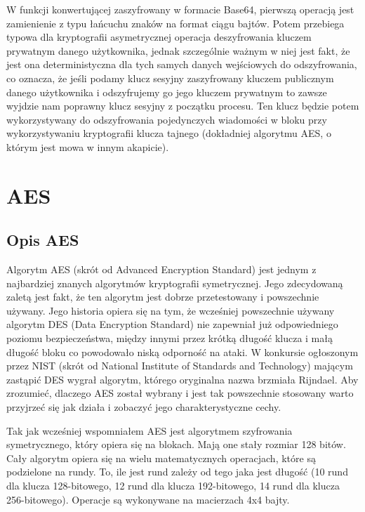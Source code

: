 W funkcji konwertującej zaszyfrowany w formacie Base64, pierwszą operacją jest zamienienie z typu łańcuchu znaków na format ciągu bajtów. Potem przebiega typowa dla kryptografii asymetrycznej operacja deszyfrowania kluczem prywatnym danego użytkownika, jednak szczególnie ważnym w niej jest fakt, że jest ona deterministyczna dla tych samych danych wejściowych do odszyfrowania, co oznacza, że jeśli podamy klucz sesyjny zaszyfrowany kluczem publicznym danego użytkownika i odszyfrujemy go jego kluczem prywatnym to zawsze wyjdzie nam poprawny klucz sesyjny z początku procesu. Ten klucz będzie potem wykorzystywany do odszyfrowania pojedynczych wiadomości w bloku przy wykorzystywaniu kryptografii klucza tajnego (dokładniej algorytmu AES, o którym jest mowa w innym akapicie).
\section{AES}
\label{sec:AES}
\subsection{Opis AES}
\label{sec:AESOpis}
Algorytm AES (skrót od Advanced Encryption Standard) jest jednym z najbardziej znanych algorytmów kryptografii symetrycznej. Jego zdecydowaną zaletą jest fakt, że ten algorytm jest dobrze przetestowany i powszechnie używany. Jego historia opiera się na tym, że wcześniej powszechnie używany algorytm DES (Data Encryption Standard) nie zapewniał już odpowiedniego poziomu bezpieczeństwa, między innymi przez krótką długość klucza i małą długość bloku co powodowało niską odporność na ataki. W konkursie ogłoszonym przez NIST (skrót od National Institute of Standards and Technology) mającym zastąpić DES wygrał algorytm, którego oryginalna nazwa brzmiała Rijndael. Aby zrozumieć, dlaczego AES został wybrany i jest tak powszechnie stosowany warto przyjrzeć się jak działa i zobaczyć jego charakterystyczne cechy.

\vspace{1em}

Tak jak wcześniej wspomniałem AES jest algorytmem szyfrowania symetrycznego, który opiera się na blokach. Mają one stały rozmiar 128 bitów. Cały algorytm opiera się na wielu matematycznych operacjach, które są podzielone na rundy. To, ile jest rund zależy od tego jaka jest długość (10 rund dla klucza 128-bitowego, 12 rund dla klucza 192-bitowego, 14 rund dla klucza 256-bitowego). Operacje są wykonywane na macierzach 4x4 bajty.

\vspace{1em}

